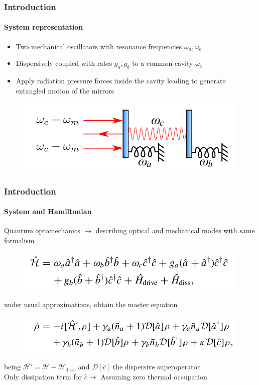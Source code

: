 \documentclass[aspectratio=43]{beamer}
\begin{document}
\begin{frame}

	\frametitle{Introduction}
	\framesubtitle{System representation}
	
	\begin{itemize}
		\item Two mechanical oscillators with resonance frequencies $\omega_{a}, \omega_{b}$
		\item Dispersively coupled with rates $g_{a}, g_{b}$ to a common cavity $\omega_{c}$
		\item Apply radiation pressure forces inside the cavity leading to generate entangled motion of the mirrors
	\end{itemize}

		\begin{figure}
			\includegraphics[width = 8 cm]{plots/plot_system.png}
		\end{figure}	

\end{frame}

\begin{frame}
	
	\frametitle{Introduction}
	\framesubtitle{System and Hamiltonian}
	
	Quantum optomechanics $\longrightarrow$ describing optical and mechanical modes with same formalism 
	\begin{figure}
		\includegraphics[width = 8 cm]{plots/hamiltonian_1.png}
	\end{figure}
	
	under usual approximations, obtain the master equation 
	\begin{figure}
		\includegraphics[width = 8 cm]{plots/master_eq_1.png}
	\end{figure}

	being $\mathcal{H}' = \mathcal{H} - \mathcal{H}_{\textrm{diss}}$, and $\mathcal{D}[\hat{c}]$ the dispersive superoperator\\
	Only dissipation term for $\hat{c} \longrightarrow$ {\color{blue}Assuming zero thermal occupation}
	
\end{frame}
\end{document}
